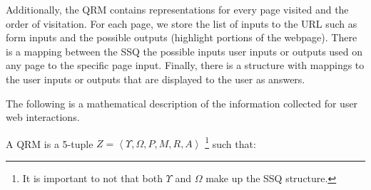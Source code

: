 Additionally, the QRM contains representations for every page visited and the order of visitation.  For each page, we store the list of inputs to the URL such as form inputs and the possible outputs (highlight portions of the webpage).  There is a mapping between the SSQ the possible inputs user inputs or outputs used on any page to the specific page input.  Finally, there is a structure with mappings to the user inputs or outputs that are displayed to the user as answers.

The following is a mathematical description of the information collected for user web interactions.

A QRM is a 5-tuple $Z = \left< \Upsilon, \Omega, P, M, R, A \right>$ \footnote{It is important to not that both $\Upsilon$ and $\Omega$ make up the SSQ structure.} such that:

